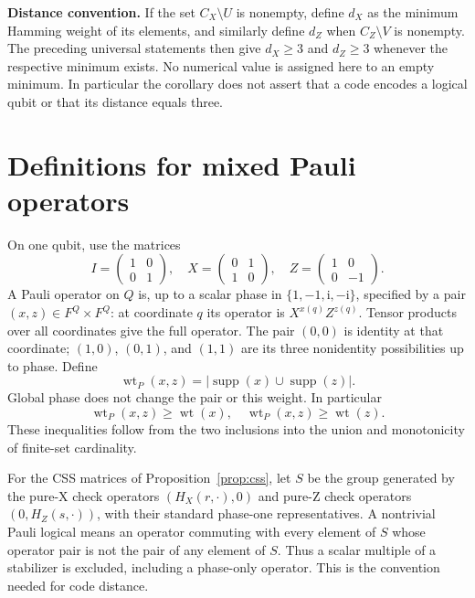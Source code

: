 \documentclass{article}
\DeclareMathOperator{\wt}{wt}
\DeclareMathOperator{\supp}{supp}
\begin{document}
\textbf{Distance convention.} If the set \(C_X \setminus U\) is nonempty, define \(d_X\) as
the minimum Hamming weight of its elements, and similarly define \(d_Z\) when
\(C_Z \setminus V\) is nonempty. The preceding universal statements then give
\(d_X \ge 3\) and \(d_Z \ge 3\) whenever the respective minimum exists. No numerical value
is assigned here to an empty minimum. In particular the corollary does not assert that a
code encodes a logical qubit or that its distance equals three.

\section{Definitions for mixed Pauli operators}\label{sec:pauli-definitions}

On one qubit, use the matrices
\begin{equation}
  I = \begin{pmatrix} 1 & 0 \\ 0 & 1 \end{pmatrix}, \quad
  X = \begin{pmatrix} 0 & 1 \\ 1 & 0 \end{pmatrix}, \quad
  Z = \begin{pmatrix} 1 & 0 \\ 0 & -1 \end{pmatrix}.
\end{equation}
A Pauli operator on \(Q\) is, up to a scalar phase in
\(\{1, -1, \mathrm{i}, -\mathrm{i}\}\), specified by a pair
\((x, z) \in F^Q \times F^Q\): at coordinate \(q\) its operator is
\(X^{x(q)} Z^{z(q)}\). Tensor products over all coordinates give the full operator. The
pair \((0, 0)\) is identity at that coordinate; \((1, 0)\), \((0, 1)\), and \((1, 1)\) are
its three nonidentity possibilities up to phase. Define
\begin{equation}
  \wt_P(x, z) = \lvert\supp(x) \cup \supp(z)\rvert.
\end{equation}
Global phase does not change the pair or this weight. In particular
\begin{equation}
  \wt_P(x, z) \ge \wt(x), \quad \wt_P(x, z) \ge \wt(z).
\end{equation}
These inequalities follow from the two inclusions into the union and monotonicity of
finite-set cardinality.

For the CSS matrices of Proposition~\ref{prop:css}, let \(S\) be the group generated by the
pure-X check operators \((H_X(r, \cdot), 0)\) and pure-Z check operators
\((0, H_Z(s, \cdot))\), with their standard phase-one representatives. A nontrivial Pauli
logical means an operator commuting with every element of \(S\) whose operator pair is not
the pair of any element of \(S\). Thus a scalar multiple of a stabilizer is excluded,
including a phase-only operator. This is the convention needed for code distance.
\end{document}
